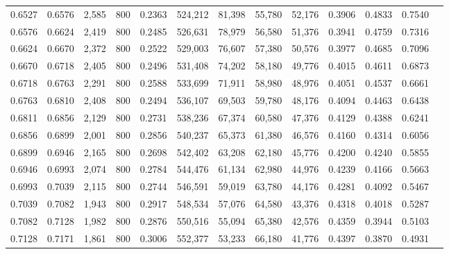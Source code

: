 \begin{tabular}{rrrrrrrrrrrrr}
0.6527 & 0.6576 &  2,585 &   800 &                                     0.2363 & 524,212 &  81,398 &  55,780 &  52,176 & 0.3906 & 0.4833 & 0.7540 \\
0.6576 & 0.6624 &  2,419 &   800 &                                     0.2485 & 526,631 &  78,979 &  56,580 &  51,376 & 0.3941 & 0.4759 & 0.7316 \\
0.6624 & 0.6670 &  2,372 &   800 &                                     0.2522 & 529,003 &  76,607 &  57,380 &  50,576 & 0.3977 & 0.4685 & 0.7096 \\
0.6670 & 0.6718 &  2,405 &   800 &                                     0.2496 & 531,408 &  74,202 &  58,180 &  49,776 & 0.4015 & 0.4611 & 0.6873 \\
0.6718 & 0.6763 &  2,291 &   800 &                                     0.2588 & 533,699 &  71,911 &  58,980 &  48,976 & 0.4051 & 0.4537 & 0.6661 \\
0.6763 & 0.6810 &  2,408 &   800 &                                     0.2494 & 536,107 &  69,503 &  59,780 &  48,176 & 0.4094 & 0.4463 & 0.6438 \\
0.6811 & 0.6856 &  2,129 &   800 &                                     0.2731 & 538,236 &  67,374 &  60,580 &  47,376 & 0.4129 & 0.4388 & 0.6241 \\
0.6856 & 0.6899 &  2,001 &   800 &                                     0.2856 & 540,237 &  65,373 &  61,380 &  46,576 & 0.4160 & 0.4314 & 0.6056 \\
0.6899 & 0.6946 &  2,165 &   800 &                                     0.2698 & 542,402 &  63,208 &  62,180 &  45,776 & 0.4200 & 0.4240 & 0.5855 \\
0.6946 & 0.6993 &  2,074 &   800 &                                     0.2784 & 544,476 &  61,134 &  62,980 &  44,976 & 0.4239 & 0.4166 & 0.5663 \\
0.6993 & 0.7039 &  2,115 &   800 &                                     0.2744 & 546,591 &  59,019 &  63,780 &  44,176 & 0.4281 & 0.4092 & 0.5467 \\
0.7039 & 0.7082 &  1,943 &   800 &                                     0.2917 & 548,534 &  57,076 &  64,580 &  43,376 & 0.4318 & 0.4018 & 0.5287 \\
0.7082 & 0.7128 &  1,982 &   800 &                                     0.2876 & 550,516 &  55,094 &  65,380 &  42,576 & 0.4359 & 0.3944 & 0.5103 \\
0.7128 & 0.7171 &  1,861 &   800 &                                     0.3006 & 552,377 &  53,233 &  66,180 &  41,776 & 0.4397 & 0.3870 & 0.4931 \\

\end{tabular}
